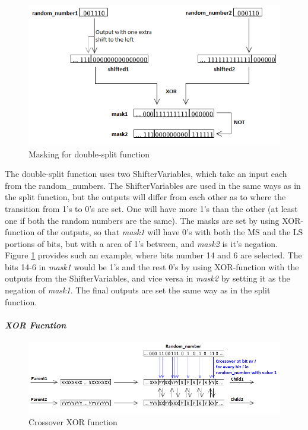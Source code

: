 \begin{figure}[H]
\includegraphics[width=\textwidth]{fpga/fig/crossover_doublesplit_mask.png}
\caption{Masking for double-split function}
\label{fig_crossover_doublesplit_mask}
\end{figure}

The double-split function uses two ShifterVariables, which take an input each from the random\_numbers. The ShifterVariables are used in the same ways as in the split function, but the outputs will differ from each other as to where the transition from 1's to 0's are set. One will have more 1's than the other (at least one if both the random numbers are the same). The masks are set by using XOR-function of the outputs, so that \emph{mask1} will have 0's with both the MS and the LS portions of bits, but with a area of 1's between, and \emph{mask2} is it's negation. Figure \ref{fig_crossover_doublesplit_mask} provides such an example, where bits number 14 and 6 are selected. The bits 14-6 in \emph{mask1} would be 1's and the rest 0's by using XOR-function with the outputs from the ShifterVariables, and vice versa in \emph{mask2} by setting it as the negation of \emph{mask1}. The final outputs are set the same way as in the split function. 

\paragraph{\textit{XOR Fucntion}}
\begin{figure}[H]
\includegraphics[width=\textwidth]{fpga/fig/crossover_xor.png}
\caption{Crossover XOR function}
\label{fig_crossover_xor}
\end{figure}


